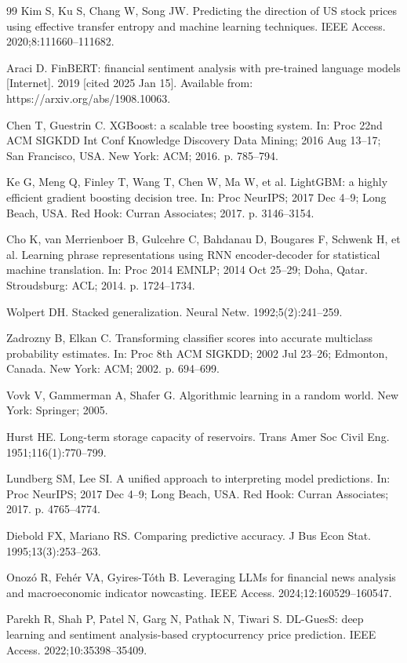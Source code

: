 \documentclass[12pt,a4paper]{article}
\begin{document}
\begin{singlespace}
\begin{thebibliography}{99}
Kim S, Ku S, Chang W, Song JW. Predicting the direction of US stock prices
using effective transfer entropy and machine learning techniques. IEEE Access.
2020;8:111660--111682.

Araci D. FinBERT: financial sentiment analysis with pre-trained language
models [Internet]. 2019 [cited 2025 Jan 15]. Available from:
https://arxiv.org/abs/1908.10063.

Chen T, Guestrin C. XGBoost: a scalable tree boosting system. In: Proc 22nd
ACM SIGKDD Int Conf Knowledge Discovery Data Mining; 2016 Aug 13--17; San
Francisco, USA. New York: ACM; 2016. p. 785--794.

Ke G, Meng Q, Finley T, Wang T, Chen W, Ma W, et al. LightGBM: a highly
efficient gradient boosting decision tree. In: Proc NeurIPS; 2017 Dec 4--9;
Long Beach, USA. Red Hook: Curran Associates; 2017. p. 3146--3154.

Cho K, van Merrienboer B, Gulcehre C, Bahdanau D, Bougares F, Schwenk H,
et al. Learning phrase representations using RNN encoder-decoder for
statistical machine translation. In: Proc 2014 EMNLP; 2014 Oct 25--29;
Doha, Qatar. Stroudsburg: ACL; 2014. p. 1724--1734.

Wolpert DH. Stacked generalization. Neural Netw. 1992;5(2):241--259.

Zadrozny B, Elkan C. Transforming classifier scores into accurate multiclass
probability estimates. In: Proc 8th ACM SIGKDD; 2002 Jul 23--26; Edmonton,
Canada. New York: ACM; 2002. p. 694--699.

Vovk V, Gammerman A, Shafer G. Algorithmic learning in a random world.
New York: Springer; 2005.

Hurst HE. Long-term storage capacity of reservoirs. Trans Amer Soc Civil
Eng. 1951;116(1):770--799.

Lundberg SM, Lee SI. A unified approach to interpreting model predictions.
In: Proc NeurIPS; 2017 Dec 4--9; Long Beach, USA. Red Hook: Curran
Associates; 2017. p. 4765--4774.

Diebold FX, Mariano RS. Comparing predictive accuracy. J Bus Econ Stat.
1995;13(3):253--263.

Onoz\'o R, Feh\'er VA, Gyires-T\'oth B. Leveraging LLMs for financial news
analysis and macroeconomic indicator nowcasting. IEEE Access.
2024;12:160529--160547.

Parekh R, Shah P, Patel N, Garg N, Pathak N, Tiwari S. DL-GuesS: deep
learning and sentiment analysis-based cryptocurrency price prediction. IEEE
Access. 2022;10:35398--35409.


\end{thebibliography}
\end{singlespace}
\end{document}
